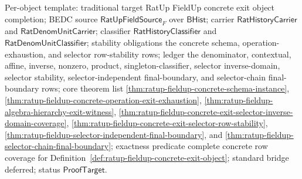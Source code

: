 Per-object template: traditional target RatUp FieldUp concrete exit object
completion; BEDC source $\mathsf{RatUpFieldSource}_F$ over $\mathsf{BHist}$;
carrier $\mathsf{RatHistoryCarrier}$ and $\mathsf{RatDenomUnitCarrier}$;
classifier $\mathsf{RatHistoryClassifier}$ and
$\mathsf{RatDenomUnitClassifier}$; stability obligations the concrete schema,
operation-exhaustion, and selector row-stability rows; ledger the denominator,
contextual, affine, inverse, nonzero, product, singleton-classifier, selector
inverse-domain, selector stability, selector-independent final-boundary, and
selector-chain final-boundary rows; core theorem list
\autoref{thm:ratup-fieldup-concrete-schema-instance},
\autoref{thm:ratup-fieldup-concrete-operation-exit-exhaustion},
\autoref{thm:ratup-fieldup-algebra-hierarchy-exit-witness},
\autoref{thm:ratup-fieldup-concrete-exit-selector-inverse-domain-coverage},
\autoref{thm:ratup-fieldup-concrete-exit-selector-row-stability},
\autoref{thm:ratup-fieldup-selector-independent-final-boundary}, and
\autoref{thm:ratup-fieldup-selector-chain-final-boundary}; exactness predicate
complete concrete row coverage for
Definition~\ref{def:ratup-fieldup-concrete-exit-object}; standard bridge
deferred; status $\mathsf{ProofTarget}$.
